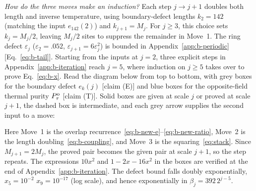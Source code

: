 \documentclass[aps,prl,reprint,amsmath,amssymb,nofootinbib,raggedbottom]{revtex4-2}
\begin{document}
\emph{How do the three moves make an induction?} Each step $j\to j+1$ doubles
both length and inverse temperature, using boundary-defect lengths $k_2=142$
(matching the input $e_{142}(2)$) and $k_{j+1}=M_j$. For $j\ge3$, this choice
sets $k_j=M_j/2$, leaving $M_j/2$ sites to suppress the remainder in Move~1.
The ring defect $\varepsilon_j$ ($\varepsilon_2=.052$,
$\varepsilon_{j+1}=6\varepsilon_j^2$) is bounded in
Appendix~\ref{app:b-periodic} [Eq.~\eqref{eq:b-tail}]. Starting from the inputs
at $j=2$, three explicit steps in Appendix~\ref{app:b-iteration} reach $j=5$,
where induction on $j\ge5$ takes over to prove Eq.~\eqref{eq:b-x}. Read the
diagram below from top to bottom, with grey boxes for the boundary defect
$e_k(j)$ [claim (E)] and blue boxes for the opposite-field thermal purity
$P_{\tau}^{\mathrm{o}}$ [claim (T)]. Solid boxes are given at scale $j$ or proved at scale
$j+1$, the dashed box is intermediate, and each grey arrow supplies the second
input to a move:
\begin{proofdiagram}
\begin{prooflanes}
  
  
  
  
\end{prooflanes}
\end{proofdiagram}
Here Move~1 is the overlap recurrence~\eqref{eq:b-new-e}--\eqref{eq:b-new-ratio},
Move~2 is the length doubling~\eqref{eq:b-coupling}, and Move~3 is the
squaring~\eqref{eq:stack}. Since $M_{j+1}=2M_j$, the proved pair becomes the
given pair at scale $j+1$, so the step repeats. The expressions $10x^2$ and
$1-2x-16x^2$ in the boxes are verified at the end of
Appendix~\ref{app:b-iteration}. The defect bound falls doubly exponentially,
$x_5=10^{-2}$\,\,$x_9=10^{-17}$ (log
scale), and hence exponentially in $\beta_j=392\,2^{j-5}$.
\end{document}
